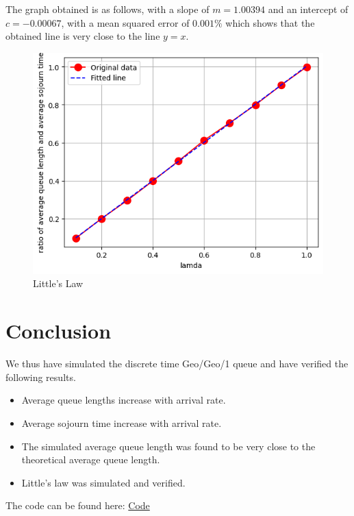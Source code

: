 \documentclass[11pt, a4paper]{article}
\begin{document}
The graph obtained is as follows, with a slope of $m = 1.00394$ and an intercept of $c = -0.00067$, with a mean squared error of $0.001\%$ which shows that the obtained line is very close to the line $y=x$.


\begin{figure}[H]
     \centering
     \includegraphics[scale=0.6]{Figure_8.png}
     \caption{Little's Law}
\end{figure}

\section{Conclusion}
We thus have simulated the discrete time Geo/Geo/1 queue and have verified the following results.
\begin{itemize}
\item Average queue lengths increase with arrival rate.
\item Average sojourn time increase with arrival rate.
\item The simulated average queue length was found to be very close to the theoretical average queue length.
\item Little's law was simulated and verified.
\end{itemize}

The code can be found here: \href{https://drive.google.com/drive/folders/1NdwyRu0YszZP-SYvFp2CQcfdz0ehORMg?usp=sharing}{Code}
\end{document}
